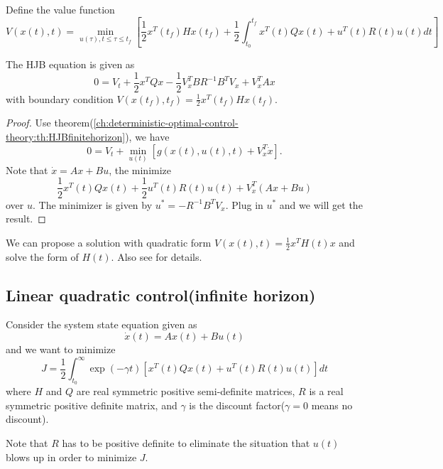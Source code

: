 \begin{refsection}
\begin{theorem}
	Define the value function $$V(x(t),t)=\min_{u(\tau),t\leq \tau \leq t_f}[\frac{1}{2}x^T(t_f)Hx(t_f) + \frac{1}{2}\int_{t_0}^{t_f} x^T(t)Qx(t) + u^T(t)R(t)u(t) dt]$$
	
	
	The HJB equation is given as
	$$0 = V_t + \frac{1}{2}x^TQx- \frac{1}{2}V^{T}_xBR^{-1}B^TV_x+V^{T}_xAx$$ with boundary condition $V(x(t_f),t_f) = \frac{1}{2}x^T(t_f)Hx(t_f)$.
\end{theorem}
\begin{proof}
Use theorem(\autoref{ch:deterministic-optimal-control-theory:th:HJBfinitehorizon}), we have
$$0 = V_t + \min_{u(t)}[ g(x(t),u(t),t) + V_x^T\dot{x}].$$
Note that $\dot{x} = Ax + Bu$, the minimize 
$$\frac{1}{2}x^T(t)Qx(t) + \frac{1}{2}u^T(t)R(t)u(t) + V_x^T(Ax+Bu)$$
over $u$.
The minimizer is given by $u^* = -R^{-1}B^TV_x$.
Plug in $u^*$ and we will get the result.
	
	
	
\end{proof}

\begin{remark}
We can propose a solution with quadratic form $V(x(t),t) = \frac{1}{2}x^TH(t)x$ and solve the form of $H(t)$.
 Also see \cite[93]{kirk2012optimal} for details. 	
\end{remark}



\subsection{Linear quadratic control(infinite horizon)}

\begin{definition}
Consider the system state equation given as
$$\dot{x}(t) = Ax(t) + Bu(t)$$
and we want to minimize
$$J = \frac{1}{2}\int_{t_0}^{\infty}\exp(-\gamma t)[ x^T(t)Qx(t) + u^T(t)R(t)u(t)] dt$$
where $H$ and $Q$ are real symmetric positive semi-definite matrices, $R$ is a real symmetric positive definite matrix, and $\gamma$ is the discount factor($\gamma = 0$ means no discount).	
\end{definition}


\begin{remark}
Note that $R$ has to be positive definite to eliminate the situation that $u(t)$ blows up in order to minimize $J$.
\end{remark}




\end{refsection}
